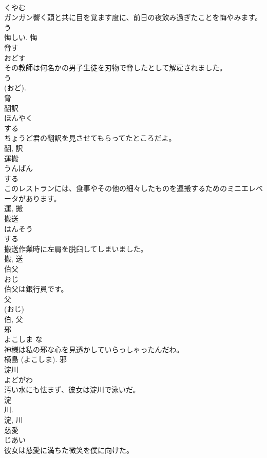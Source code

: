 \documentclass[8pt]{extreport}
\begin{document}
\begin{CJK}{UTF8}{min}
\\	くやむ	
\\	ガンガン響く頭と共に目を覚ます度に、前日の夜飲み過ぎたことを悔やみます。	
\\	う 
\\	悔しい.	悔	
\\	脅す	
\\	おどす	
\\	その教師は何名かの男子生徒を刃物で脅したとして解雇されました。	
\\	う 
\\	(おど). 
\\	脅	
\\	翻訳	
\\	ほんやく	
\\	する 
\\	ちょうど君の翻訳を見させてもらってたところだよ。	
\\	翻, 訳	
\\	運搬	
\\	うんぱん	
\\	する 
\\	このレストランには、食事やその他の細々したものを運搬するためのミニエレベータがあります。	
\\	運, 搬	
\\	搬送	
\\	はんそう	
\\	する 
\\	搬送作業時に左肩を脱臼してしまいました。	
\\	搬, 送	
\\	伯父	
\\	おじ	
\\	伯父は銀行員です。	
\\	父 
\\	(おじ)
\\	伯, 父	
\\	邪	
\\	よこしま	な 
\\	神様は私の邪な心を見透かしていらっしゃったんだわ。	
\\	横島 (よこしま).	邪	
\\	淀川	
\\	よどがわ	
\\	汚い水にも怯まず、彼女は淀川で泳いだ。	
\\	淀 
\\	川. 
\\	淀, 川	
\\	慈愛	
\\	じあい	
\\	彼女は慈愛に満ちた微笑を僕に向けた。	

\end{CJK}
\end{document}
